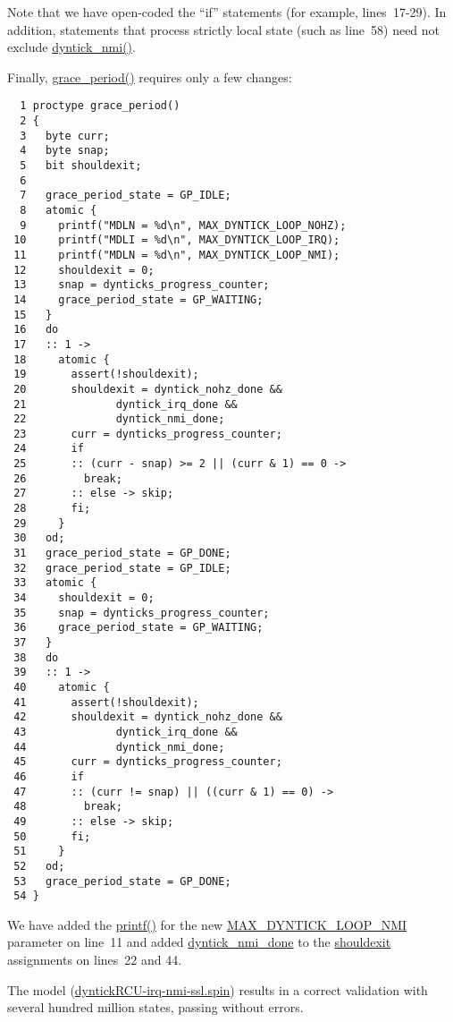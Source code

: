 Note that we have open-coded the ``if'' statements
(for example, lines~17-29).
In addition, statements that process strictly local state
(such as line~58) need not exclude \url{dyntick_nmi()}.

Finally, \url{grace_period()} requires only a few changes:

{ \scriptsize
\begin{verbatim}
  1 proctype grace_period()
  2 {
  3   byte curr;
  4   byte snap;
  5   bit shouldexit;
  6 
  7   grace_period_state = GP_IDLE;
  8   atomic {
  9     printf("MDLN = %d\n", MAX_DYNTICK_LOOP_NOHZ);
 10     printf("MDLI = %d\n", MAX_DYNTICK_LOOP_IRQ);
 11     printf("MDLN = %d\n", MAX_DYNTICK_LOOP_NMI);
 12     shouldexit = 0;
 13     snap = dynticks_progress_counter;
 14     grace_period_state = GP_WAITING;
 15   }
 16   do
 17   :: 1 ->
 18     atomic {
 19       assert(!shouldexit);
 20       shouldexit = dyntick_nohz_done &&
 21              dyntick_irq_done &&
 22              dyntick_nmi_done;
 23       curr = dynticks_progress_counter;
 24       if
 25       :: (curr - snap) >= 2 || (curr & 1) == 0 ->
 26         break;
 27       :: else -> skip;
 28       fi;
 29     }
 30   od;
 31   grace_period_state = GP_DONE;
 32   grace_period_state = GP_IDLE;
 33   atomic {
 34     shouldexit = 0;
 35     snap = dynticks_progress_counter;
 36     grace_period_state = GP_WAITING;
 37   }
 38   do
 39   :: 1 ->
 40     atomic {
 41       assert(!shouldexit);
 42       shouldexit = dyntick_nohz_done &&
 43              dyntick_irq_done &&
 44              dyntick_nmi_done;
 45       curr = dynticks_progress_counter;
 46       if
 47       :: (curr != snap) || ((curr & 1) == 0) ->
 48         break;
 49       :: else -> skip;
 50       fi;
 51     }
 52   od;
 53   grace_period_state = GP_DONE;
 54 }
\end{verbatim}
}

We have added the \url{printf()} for the new
\url{MAX_DYNTICK_LOOP_NMI} parameter on line~11 and
added \url{dyntick_nmi_done} to the \url{shouldexit}
assignments on lines~22 and 44.

The model (\url{dyntickRCU-irq-nmi-ssl.spin})
results in a correct validation with several hundred million
states, passing without errors.

